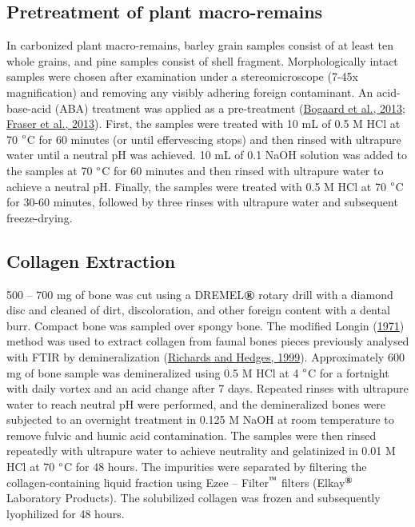 \documentclass[preprint, 3p, authoryear]{elsarticle} %
\begin{document}
\hypertarget{pretreatment-of-plant-macro-remains}{%
\subsection{Pretreatment of plant macro-remains}\label{pretreatment-of-plant-macro-remains}}

In carbonized plant macro-remains, barley grain samples consist of at least ten whole grains, and pine samples consist of shell fragment. Morphologically intact samples were chosen after examination under a stereomicroscope (7-45x magnification) and removing any visibly adhering foreign contaminant. An acid-base-acid (ABA) treatment was applied as a pre-treatment (\protect\hyperlink{ref-bogaard_etal13}{Bogaard et al., 2013}; \protect\hyperlink{ref-fraser_etal13a}{Fraser et al., 2013}). First, the samples were treated with 10 mL of 0.5 M HCl at 70 \(\text{\textdegree}\)C for 60 minutes (or until effervescing stops) and then rinsed with ultrapure water until a neutral pH was achieved. 10 mL of 0.1 NaOH solution was added to the samples at 70 \(\text{\textdegree}\)C for 60 minutes and then rinsed with ultrapure water to achieve a neutral pH. Finally, the samples were treated with 0.5 M HCl at 70 \(\text{\textdegree}\)C for 30-60 minutes, followed by three rinses with ultrapure water and subsequent freeze-drying.

\hypertarget{collagen-extraction}{%
\subsection{Collagen Extraction}\label{collagen-extraction}}

500 -- 700 mg of bone was cut using a DREMEL\(\text{\textregistered}\) rotary drill with a diamond disc and cleaned of dirt, discoloration, and other foreign content with a dental burr. Compact bone was sampled over spongy bone. The modified Longin (\protect\hyperlink{ref-longin71}{1971}) method was used to extract collagen from faunal bones pieces previously analysed with FTIR by demineralization (\protect\hyperlink{ref-richards_hedges99}{Richards and Hedges, 1999}). Approximately 600 mg of bone sample was demineralized using 0.5 M HCl at 4 \(\text{\textdegree}\)C for a fortnight with daily vortex and an acid change after 7 days. Repeated rinses with ultrapure water to reach neutral pH were performed, and the demineralized bones were subjected to an overnight treatment in 0.125 M NaOH at room temperature to remove fulvic and humic acid contamination. The samples were then rinsed repeatedly with ultrapure water to achieve neutrality and gelatinized in 0.01 M HCl at 70 \(\text{\textdegree}\)C for 48 hours. The impurities were separated by filtering the collagen-containing liquid fraction using Ezee -- Filter\(^\text{\texttrademark}\) filters (Elkay\(^\text{\textregistered}\) Laboratory Products). The solubilized collagen was frozen and subsequently lyophilized for 48 hours.
\end{document}
